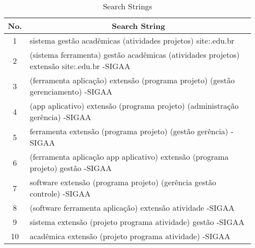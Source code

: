 \begin{table}[!htb]
  \centering
  \caption{Search Strings}
  \label{tab:gl-strings}
  \footnotesize
  \begin{tabular}{c|l}
    \bottomrule
    \rowcolor[rgb]{0.753,0.753,0.753} \textbf{No.} & \multicolumn{1}{c}{\textbf{Search String}}                                                                                  \\
    \hline
    \rowcolor[rgb]{0.898,0.898,0.898} 1            & sistema gestão acadêmicas (atividades \textbar{} projetos) site:.edu.br                                                     \\
    2                                              & (sistema \textbar{} ferramenta) gestão acadêmicas (atividades \textbar{} projetos) extensão site:.edu.br -SIGAA             \\
    \rowcolor[rgb]{0.898,0.898,0.898} 3            & (ferramenta \textbar{} aplicação) extensão (programa \textbar{} projeto) (gestão \textbar{} gerenciamento) -SIGAA           \\
    4                                              & (app \textbar{} aplicativo) extensão (programa \textbar{} projeto) (administração \textbar{} gerência) -SIGAA               \\
    \rowcolor[rgb]{0.898,0.898,0.898} 5            & ferramenta extensão (programa \textbar{} projeto) (gestão \textbar{} gerência) -SIGAA                                       \\
    6                                              & (ferramenta \textbar{} aplicação \textbar{} app \textbar{} aplicativo) extensão (programa \textbar{} projeto) gestão -SIGAA \\
    \rowcolor[rgb]{0.898,0.898,0.898} 7            & software extensão (programa \textbar{} projeto) (gerência \textbar{} gestão \textbar{} controle) -SIGAA                     \\
    8                                              & (software \textbar{} ferramenta \textbar{} aplicação) extensão atividade -SIGAA                                             \\
    \rowcolor[rgb]{0.898,0.898,0.898} 9            & sistema extensão (projeto \textbar{} programa \textbar{} atividade) gestão -SIGAA                                           \\
    10                                             & acadêmica extensão (projeto \textbar{} programa \textbar{} atividade) -SIGAA                                                \\
    \toprule
  \end{tabular}
\end{table}
